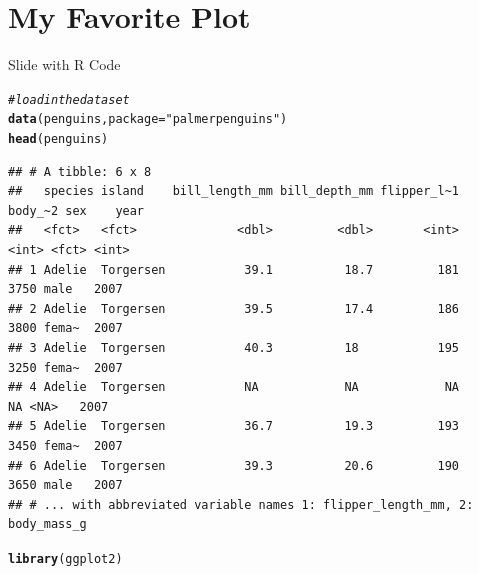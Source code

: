 \documentclass{beamer}\usepackage[]{graphicx}\usepackage[]{graphicx}\usepackage[]{xcolor}
\makeatletter
\newcommand{\hlstr}[1]{\textcolor[rgb]{0.192,0.494,0.8}{#1}}%
\newcommand{\hlcom}[1]{\textcolor[rgb]{0.678,0.584,0.686}{\textit{#1}}}%
\newcommand{\hlstd}[1]{\textcolor[rgb]{0.345,0.345,0.345}{#1}}%
\newcommand{\hlkwc}[1]{\textcolor[rgb]{0.333,0.667,0.333}{#1}}%
\newcommand{\hlkwd}[1]{\textcolor[rgb]{0.737,0.353,0.396}{\textbf{#1}}}%
\newenvironment{kframe}{%
 \def\at@end@of@kframe{}%
 \ifinner\ifhmode%
  \def\at@end@of@kframe{\end{minipage}}%
  \begin{minipage}{\columnwidth}%
 \fi\fi%
 \def\FrameCommand##1{\hskip\@totalleftmargin \hskip-\fboxsep
 \colorbox{shadecolor}{##1}\hskip-\fboxsep
     \hskip-\linewidth \hskip-\@totalleftmargin \hskip\columnwidth}%
 \MakeFramed {\advance\hsize-\width
   \@totalleftmargin\z@ \linewidth\hsize
   \@setminipage}}%
 {\par\unskip\endMakeFramed%
 \at@end@of@kframe}
\newenvironment{knitrout}{}{} %
\makeatother
\begin{document}
\section{My Favorite Plot}

\begin{frame}[fragile]{Slide with R Code}
\begin{knitrout}
\color{fgcolor}\begin{kframe}
\begin{alltt}
\hlcom{# load in the data set}
\hlkwd{data}\hlstd{(penguins,} \hlkwc{package} \hlstd{=} \hlstr{"palmerpenguins"}\hlstd{)}
\hlkwd{head}\hlstd{(penguins)}
\end{alltt}
\begin{verbatim}
## # A tibble: 6 x 8
##   species island    bill_length_mm bill_depth_mm flipper_l~1 body_~2 sex    year
##   <fct>   <fct>              <dbl>         <dbl>       <int>   <int> <fct> <int>
## 1 Adelie  Torgersen           39.1          18.7         181    3750 male   2007
## 2 Adelie  Torgersen           39.5          17.4         186    3800 fema~  2007
## 3 Adelie  Torgersen           40.3          18           195    3250 fema~  2007
## 4 Adelie  Torgersen           NA            NA            NA      NA <NA>   2007
## 5 Adelie  Torgersen           36.7          19.3         193    3450 fema~  2007
## 6 Adelie  Torgersen           39.3          20.6         190    3650 male   2007
## # ... with abbreviated variable names 1: flipper_length_mm, 2: body_mass_g
\end{verbatim}
\begin{alltt}
\hlkwd{library}\hlstd{(ggplot2)}
\end{alltt}


{\ttfamily\noindent\color{warningcolor}{\#\# Warning: package 'ggplot2' was built under R version 4.1.3}}\end{kframe}
\end{knitrout}
\end{frame}
\end{document}
